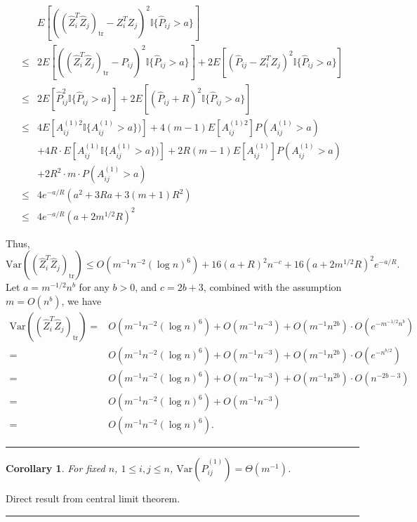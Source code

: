 \documentclass[a4paper]{article}
\newenvironment{proof}{{\bf Proof:  }}{\hfill\rule{2mm}{2mm}}
\newtheorem{corollary}[fact]{Corollary}
\begin{document}
\begin{proof}
\begin{align*}
	& E[((\hat{Z}_i^T \hat{Z}_j)_{\mathrm{tr}} - Z_i^T Z_j)^2 \mathbb{I}\{\hat{P}_{ij} > a\}] \\
	\le & 2 E[((\hat{Z}_i^T \hat{Z}_j)_{\mathrm{tr}} - \hat{P}_{ij})^2 \mathbb{I}\{\hat{P}_{ij} > a\}] + 2 E[(\hat{P}_{ij} - Z_i^T Z_j)^2 \mathbb{I}\{\hat{P}_{ij} > a\}] \\
	\le & 2 E[\hat{P}_{ij}^2 \mathbb{I}\{\hat{P}_{ij} > a\}] + 2 E[(\hat{P}_{ij} + R)^2 \mathbb{I}\{\hat{P}_{ij} > a\}] \\
	\le & 4 E[A_{ij}^{(1)2} \mathbb{I} \{ A_{ij}^{(1)} > a \})] + 4(m-1) E[A_{ij}^{(1)2}] P(A_{ij}^{(1)} > a) \\
	& + 4R \cdot E[A_{ij}^{(1)} \mathbb{I} \{ A_{ij}^{(1)} > a \})] + 2R(m-1) E[A_{ij}^{(1)}] P(A_{ij}^{(1)} > a) \\
	& + 2R^2 \cdot m \cdot P(A_{ij}^{(1)} > a) \\
	\le & 4 e^{-a/R} \left( a^2 + 3R a + 3(m+1)R^2 \right) \\
	\le & 4 e^{-a/R} (a + 2 m^{1/2} R)^2
\end{align*}

Thus,
\[
	\mathrm{Var}((\hat{Z}_i^T \hat{Z}_j)_{\mathrm{tr}}) \le
	O(m^{-1} n^{-2} (\log n)^6) + 16 (a+R)^2 n^{-c} + 16 (a+2 m^{1/2} R)^2 e^{-a/R}.
\]
Let $a = m^{-1/2} n^{b}$ for any $b > 0$, and $c = 2b + 3$, combined with the assumption $m = O(n^{b})$, we have
\begin{align*}
	\mathrm{Var}((\hat{Z}_i^T \hat{Z}_j)_{\mathrm{tr}})
	= & O(m^{-1} n^{-2} (\log n)^6) + O(m^{-1} n^{-3}) + O(m^{-1} n^{2b}) \cdot O(e^{-m^{-1/2} n^{b}}) \\
	= & O(m^{-1} n^{-2} (\log n)^6) + O(m^{-1} n^{-3}) + O(m^{-1} n^{2b}) \cdot O(e^{- n^{b/2}}) \\
	= & O(m^{-1} n^{-2} (\log n)^6) + O(m^{-1} n^{-3}) + O(m^{-1} n^{2b}) \cdot O(n^{-2b-3}) \\
	= & O(m^{-1} n^{-2} (\log n)^6) + O(m^{-1} n^{-3}) \\
	= & O(m^{-1} n^{-2} (\log n)^6).
\end{align*}
\end{proof}



\begin{corollary}
\label{cor:VarL1}
For fixed $n$, $1 \le i,j \le n$, $\mathrm{Var}(\hat{P}^{(1)}_{ij}) = \Theta(m^{-1})$.
\end{corollary}
\begin{proof}
Direct result from central limit theorem.
\end{proof}
\end{document}
